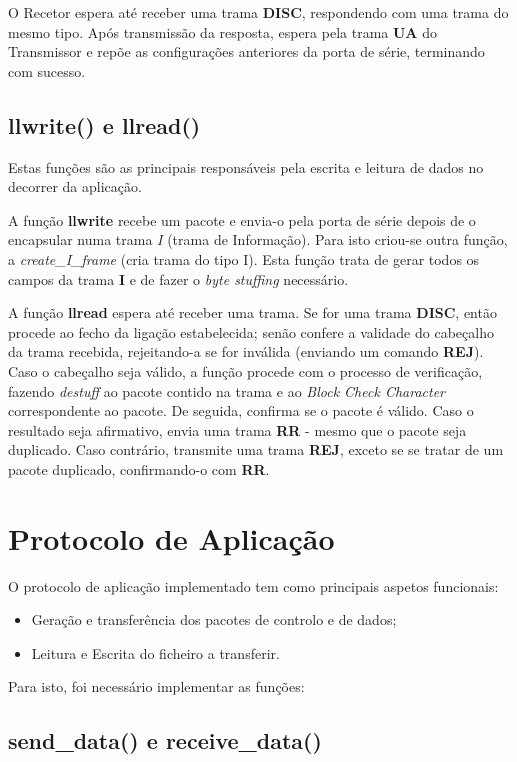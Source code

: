 \documentclass[11pt]{article}
\begin{document}
O Recetor espera até receber uma trama \textbf{DISC}, respondendo com uma trama do mesmo tipo. Após transmissão da resposta, espera pela trama \textbf{UA} do Transmissor e repõe as configurações anteriores da porta de série, terminando com sucesso.

\subsection{llwrite() e llread()}

Estas funções são as principais responsáveis pela escrita e leitura de dados no decorrer da aplicação.

A função \textbf{llwrite} recebe um pacote e envia-o pela porta de série depois de o encapsular numa trama \textit{I} (trama de Informação). Para isto criou-se outra função, a \textit{create\_I\_frame} (cria trama do tipo I). Esta função trata de gerar todos os campos da trama \textbf{I} e de fazer o \textit{byte stuffing} necessário.

A função \textbf{llread} espera até receber uma trama. Se for uma trama \textbf{DISC}, então procede ao fecho da ligação estabelecida; senão confere a validade do cabeçalho da trama recebida, rejeitando-a se for inválida (enviando um comando \textbf{REJ}). Caso o cabeçalho seja válido, a função procede com o processo de verificação, fazendo \textit{destuff} ao pacote contido na trama e ao \textit{Block Check Character} correspondente ao pacote. De seguida, confirma se o pacote é válido. Caso o resultado seja afirmativo, envia uma trama \textbf{RR} - mesmo que o pacote seja duplicado. Caso contrário, transmite uma trama \textbf{REJ}, exceto se se tratar de um pacote duplicado, confirmando-o com \textbf{RR}.

\newpage
\section{Protocolo de Aplicação}

O protocolo de aplicação implementado tem como principais aspetos funcionais:
\begin{itemize}
\item Geração e transferência dos pacotes de controlo e de dados;
\item Leitura e Escrita do ficheiro a transferir.
\end{itemize}

Para isto, foi necessário implementar as funções:
\subsection{send\_data() e receive\_data()}
\end{document}
